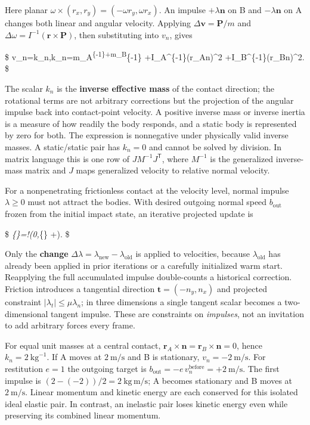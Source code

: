 Here planar \(\omega\times(r_x,r_y)=(-\omega r_y,\omega r_x)\). An impulse \(+\lambda\mathbf n\) on B and \(-\lambda\mathbf n\) on A changes both linear and angular velocity. Applying \(\Delta\mathbf v=\mathbf P/m\) and \(\Delta\omega=I^{-1}(\mathbf r\times\mathbf P)\), then substituting into \(v_n\), gives

\$ \Delta v\_n=k\_n\lambda,\qquad k\_n=m\_A\textsuperscript{\{-1\}+m\_B}\{-1\} +I\_A\^{}\{-1\}(\mathbf r\_A\times\mathbf n)\^{}2 +I\_B\^{}\{-1\}(\mathbf r\_B\times\mathbf n)\^{}2. \$

The scalar \(k_n\) is the \textbf{inverse effective mass} of the contact direction; the rotational terms are not arbitrary corrections but the projection of the angular impulse back into contact-point velocity. A positive inverse mass or inverse inertia is a measure of how readily the body responds, and a static body is represented by zero for both. The expression is nonnegative under physically valid inverse masses. A static/static pair has \(k_n=0\) and cannot be solved by division. In matrix language this is one row of \(JM^{-1}J^\mathsf T\), where \(M^{-1}\) is the generalized inverse-mass matrix and \(J\) maps generalized velocity to relative normal velocity.

For a nonpenetrating frictionless contact at the velocity level, normal impulse \(\lambda\ge0\) must not attract the bodies. With desired outgoing normal speed \(b_{\mathrm{out}}\) frozen from the initial impact state, an iterative projected update is

\$ \lambda\emph{\{\}=\max!\left(0,\lambda}\{\} +\right). \$

Only the \textbf{change} \(\Delta\lambda=\lambda_{\mathrm{new}}-\lambda_{\mathrm{old}}\) is applied to velocities, because \(\lambda_{\mathrm{old}}\) has already been applied in prior iterations or a carefully initialized warm start. Reapplying the full accumulated impulse double-counts a historical correction. Friction introduces a tangential direction \(\mathbf t=(-n_y,n_x)\) and projected constraint \(|\lambda_t|\le\mu\lambda_n\); in three dimensions a single tangent scalar becomes a two-dimensional tangent impulse. These are constraints on \emph{impulses}, not an invitation to add arbitrary forces every frame.

For equal unit masses at a central contact, \(\mathbf r_A\times\mathbf n=\mathbf r_B\times\mathbf n=0\), hence \(k_n=2\ \mathrm{kg}^{-1}\). If A moves at \(2\ \mathrm{m/s}\) and B is stationary, \(v_n=-2\ \mathrm{m/s}\). For restitution \(e=1\) the outgoing target is \(b_{\mathrm{out}}=-e\,v_n^{\mathrm{before}}=+2\ \mathrm{m/s}\). The first impulse is \((2-(-2))/2=2\ \mathrm{kg\,m/s}\); A becomes stationary and B moves at \(2\ \mathrm{m/s}\). Linear momentum and kinetic energy are each conserved for this isolated ideal elastic pair. In contrast, an inelastic pair loses kinetic energy even while preserving its combined linear momentum.

